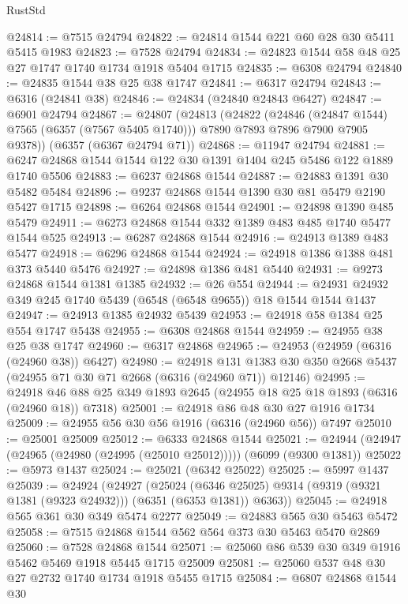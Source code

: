 \begin{lexlean}{RustStd}
\begin{coremodule}
@24814 := @7515 @24794
@24822 := @24814 @1544 @221 @60 @28 @30 @5411 @5415 @1983
@24823 := @7528 @24794
@24834 := @24823 @1544 @58 @48 @25 @27 @1747 @1740 @1734 @1918 @5404 @1715
@24835 := @6308 @24794
@24840 := @24835 @1544 @38 @25 @38 @1747
@24841 := @6317 @24794
@24843 := @6316 (@24841 @38)
@24846 := @24834 (@24840 @24843 @6427)
@24847 := @6901 @24794
@24867 := @24807
    (@24813
      (@24822
        (@24846 (@24847 @1544) @7565 (@6357 (@7567 @5405 @1740)))
        @7890
        @7893
        @7896
        @7900
        @7905
        @9378))
    (@6357 (@6367 @24794 @71))
@24868 := @11947 @24794
@24881 := @6247 @24868 @1544 @1544 @122 @30 @1391 @1404 @245 @5486 @122 @1889 @1740 @5506
@24883 := @6237 @24868 @1544
@24887 := @24883 @1391 @30 @5482 @5484
@24896 := @9237 @24868 @1544 @1390 @30 @81 @5479 @2190 @5427 @1715
@24898 := @6264 @24868 @1544
@24901 := @24898 @1390 @485 @5479
@24911 := @6273 @24868 @1544 @332 @1389 @483 @485 @1740 @5477 @1544 @525
@24913 := @6287 @24868 @1544
@24916 := @24913 @1389 @483 @5477
@24918 := @6296 @24868 @1544
@24924 := @24918 @1386 @1388 @481 @373 @5440 @5476
@24927 := @24898 @1386 @481 @5440
@24931 := @9273 @24868 @1544 @1381 @1385
@24932 := @26 @554
@24944 := @24931 @24932 @349 @245 @1740 @5439 (@6548 (@6548 @9655)) @18 @1544 @1544 @1437
@24947 := @24913 @1385 @24932 @5439
@24953 := @24918 @58 @1384 @25 @554 @1747 @5438
@24955 := @6308 @24868 @1544
@24959 := @24955 @38 @25 @38 @1747
@24960 := @6317 @24868
@24965 := @24953 (@24959 (@6316 (@24960 @38)) @6427)
@24980 := @24918
    @131
    @1383
    @30
    @350
    @2668
    @5437
    (@24955 @71 @30 @71 @2668 (@6316 (@24960 @71)) @12146)
@24995 := @24918 @46 @88 @25 @349 @1893 @2645 (@24955 @18 @25 @18 @1893 (@6316 (@24960 @18)) @7318)
@25001 := @24918 @86 @48 @30 @27 @1916 @1734
@25009 := @24955 @56 @30 @56 @1916 (@6316 (@24960 @56)) @7497
@25010 := @25001 @25009
@25012 := @6333 @24868 @1544
@25021 := @24944 (@24947 (@24965 (@24980 (@24995 (@25010 @25012))))) (@6099 (@9300 @1381))
@25022 := @5973 @1437
@25024 := @25021 (@6342 @25022)
@25025 := @5997 @1437
@25039 := @24924
    (@24927
      (@25024
        (@6346 @25025)
        @9314
        (@9319 (@9321 @1381 (@9323 @24932)))
        (@6351 (@6353 @1381))
        @6363))
@25045 := @24918 @565 @361 @30 @349 @5474 @2277
@25049 := @24883 @565 @30 @5463 @5472
@25058 := @7515 @24868 @1544 @562 @564 @373 @30 @5463 @5470 @2869
@25060 := @7528 @24868 @1544
@25071 := @25060 @86 @539 @30 @349 @1916 @5462 @5469 @1918 @5445 @1715 @25009
@25081 := @25060 @537 @48 @30 @27 @2732 @1740 @1734 @1918 @5455 @1715
@25084 := @6807 @24868 @1544 @30

\end{coremodule}
\end{lexlean}

